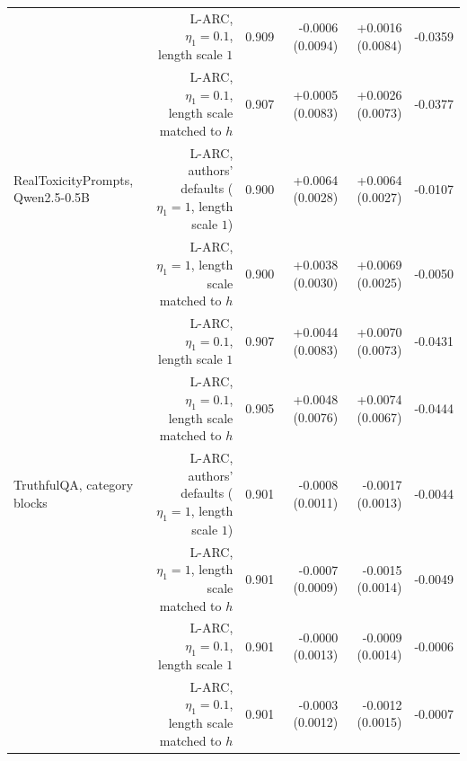\begin{table}[H]
{\begin{tabular}{lrrrrr}
 & L-ARC, $\eta_1=0.1$, length scale $1$ & 0.909 & -0.0006 (0.0094) & +0.0016 (0.0084) & -0.0359 \\
 & L-ARC, $\eta_1=0.1$, length scale matched to $h$ & 0.907 & +0.0005 (0.0083) & +0.0026 (0.0073) & -0.0377 \\
RealToxicityPrompts, Qwen2.5-0.5B & L-ARC, authors' defaults ($\eta_1=1$, length scale $1$) & 0.900 & +0.0064 (0.0028) & +0.0064 (0.0027) & -0.0107 \\
 & L-ARC, $\eta_1=1$, length scale matched to $h$ & 0.900 & +0.0038 (0.0030) & +0.0069 (0.0025) & -0.0050 \\
 & L-ARC, $\eta_1=0.1$, length scale $1$ & 0.907 & +0.0044 (0.0083) & +0.0070 (0.0073) & -0.0431 \\
 & L-ARC, $\eta_1=0.1$, length scale matched to $h$ & 0.905 & +0.0048 (0.0076) & +0.0074 (0.0067) & -0.0444 \\
TruthfulQA, category blocks & L-ARC, authors' defaults ($\eta_1=1$, length scale $1$) & 0.901 & -0.0008 (0.0011) & -0.0017 (0.0013) & -0.0044 \\
 & L-ARC, $\eta_1=1$, length scale matched to $h$ & 0.901 & -0.0007 (0.0009) & -0.0015 (0.0014) & -0.0049 \\
 & L-ARC, $\eta_1=0.1$, length scale $1$ & 0.901 & -0.0000 (0.0013) & -0.0009 (0.0014) & -0.0006 \\
 & L-ARC, $\eta_1=0.1$, length scale matched to $h$ & 0.901 & -0.0003 (0.0012) & -0.0012 (0.0015) & -0.0007 \\
\bottomrule
\end{tabular}
}
\end{table}


